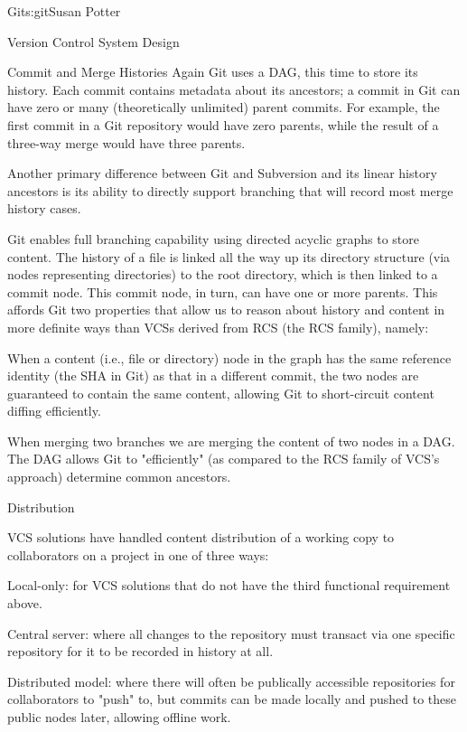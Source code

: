\begin{aosachapter}{Git}{s:git}{Susan Potter}
\begin{aosasect1}{Version Control System Design}
\begin{aosasect2}{Commit and Merge Histories}
Again Git uses a DAG, this time to store its history. Each commit contains
metadata about its ancestors; a commit in Git can have zero or many
(theoretically unlimited) parent commits. For example, the first commit
in a Git repository would have zero parents, while the result of a three-way merge
would have three parents.

Another primary difference between Git and Subversion and its linear history
ancestors is its ability to directly support branching that will record
most merge history cases.


Git enables full branching capability using directed acyclic
graphs to store content. The history of a file is linked all the way
up its directory structure (via nodes representing directories) to the root
directory, which is then linked to a commit node. This commit node, in turn,
can have one or more parents. This affords Git two
properties that allow us to reason about history and content in
more definite ways than VCSs derived from RCS (the RCS family), namely:
\begin{aosaitemize}
  \item When a content (i.e., file or directory) node in the graph has the same
  reference identity (the SHA in Git) as that in a different commit, the two
  nodes are guaranteed to contain the same content, allowing Git to
  short-circuit content diffing efficiently.
  \item When merging two branches we are merging the content of two nodes
  in a DAG. The DAG allows Git to "efficiently" (as compared to the
  RCS family of VCS's approach) determine common ancestors.
\end{aosaitemize}

\end{aosasect2}
\begin{aosasect2}{Distribution}

VCS solutions have handled content distribution of a working copy to collaborators on a
project in one of three ways:
\begin{aosaitemize}
  \item Local-only: for VCS solutions that do not have the
    third functional requirement above.
  \item Central server: where all changes to the repository must transact
    via one specific repository for it to be recorded in history at all.
  \item Distributed model: where there will often be publically accessible
    repositories for collaborators to "push" to, but commits can be made
    locally and pushed to these public nodes later, allowing offline work.
\end{aosaitemize}


\end{aosasect2}
\end{aosasect1}
\end{aosachapter}

